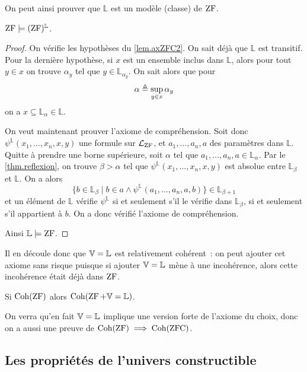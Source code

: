 On peut ainsi prouver que $\mathbb L$ est un modèle (classe) de $\operatorname{ZF}$.

\begin{theorem}
  $\operatorname{ZF}\models (\operatorname{ZF})^{\mathbb L}$.
\end{theorem}

\begin{proof}
  On vérifie les hypothèses du \cref{lem.axZFC2}. On sait déjà que $\mathbb L$
  est transitif. Pour la dernière hypothèse, si $x$ est un ensemble inclus dans
  $\mathbb L$, alors pour tout $y \in x$ on trouve $\alpha_y$ tel que
  $y \in \mathbb L_{\alpha_y}$. On sait alors que pour
  \[\alpha \triangleq \sup_{y \in x} \alpha_y\]
  on a $x \subseteq \mathbb L_\alpha \in \mathbb L$.

  On veut maintenant prouver l'axiome de compréhension. Soit donc
  $\psi^{\mathbb L}(x_1,\ldots,x_n,x,y)$ une formule sur $\mathcal L_{\operatorname{ZF}}$, et
  $a_1,\ldots,a_n,a$ des paramètres dans $\mathbb L$. Quitte à prendre une
  borne supérieure, soit $\alpha$ tel que
  $a_1,\ldots,a_n,a \in \mathbb L_\alpha$. Par le \cref{thm.reflexion}, on
  trouve $\beta > \alpha$ tel que $\psi^{\mathbb L}(x_1,\ldots,x_n,x,y)$ est
  absolue entre $\mathbb L_\beta$ et $\mathbb L$. On a alors
  \[\{ b \in \mathbb L_\beta \mid b \in a \land
  \psi^{\mathbb L}(a_1,\ldots,a_n,a,b)\} \in \mathbb L_{\beta + 1}\]
  et un élément de $\mathbb L$ vérifie $\psi^{\mathbb L}$ si et seulement s'il
  le vérifie dans $\mathbb L_{\beta}$, si et seulement s'il appartient à $b$.
  On a donc vérifié l'axiome de compréhension.

  Ainsi $\mathbb L \models \operatorname{ZF}$.
\end{proof}

Il en découle donc que $\mathbb V = \mathbb L$ est relativement cohérent~: on peut ajouter cet
axiome sans risque puisque si ajouter $\mathbb V = \mathbb L$ mène à une incohérence, alors
cette incohérence était déjà dans $\operatorname{ZF}$.

\begin{corollary}
  Si $\operatorname{Coh}(\operatorname{ZF})$ alors $\operatorname{Coh}(\operatorname{ZF} + \mathbb V = \mathbb L)$.
\end{corollary}

\begin{remark}
  On verra qu'en fait $\mathbb V = \mathbb L$ implique une version forte de l'axiome du choix,
  donc on a aussi une preuve de $\operatorname{Coh}(\operatorname{ZF})\implies \operatorname{Coh}(\operatorname{ZFC})$.
\end{remark}

\subsection{Les propriétés de l'univers constructible}

